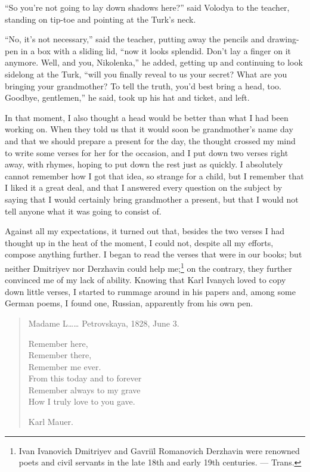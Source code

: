 ``So you're not going to lay down shadows here?'' said Volodya to the teacher, standing on tip-toe and pointing at the Turk's neck. %

``No, it's not necessary,'' said the teacher, putting away the pencils and drawing-pen in a box with a sliding lid, ``now it looks splendid. Don't lay a finger on it anymore. Well, and you, Nikolenka,'' he added, getting up and continuing to look sidelong at the Turk, ``will you finally reveal to us your secret? What are you bringing your grandmother? To tell the truth, you'd best bring a head, too. Goodbye, gentlemen,'' he said, took up his hat and ticket, and left.

In that moment, I also thought a head would be better than what I had been working on. When they told us that it would soon be grandmother's name day and that we should prepare a present for the day, the thought crossed my mind to write some verses for her for the occasion, and I put down two verses right away, with rhymes, hoping to put down the rest just as quickly. I absolutely cannot remember how I got that idea, so strange for a child, but I remember that I liked it a great deal, and that I answered every question on the subject by saying that I would certainly bring grandmother a present, but that I would not tell anyone what it was going to consist of.

Against all my expectations, it turned out that, besides the two verses I had thought up in the heat of the moment, I could not, despite all my efforts, compose anything further. I began to read the verses that were in our books; but neither Dmitriyev nor Derzhavin could help me;\footnote{Ivan Ivanovich Dmitriyev and Gavri\"il Romanovich Derzhavin were renowned poets and civil servants in the late 18th and early 19th centuries. --- Trans.} on the contrary, they further convinced me of my lack of ability. Knowing that Karl Ivanych loved to copy down little verses, I started to rummage around in his papers and, among some German poems, I found one, Russian, apparently from his own pen.

\begin{verse}
Madame L\ldots{}\ldots{} Petrovskaya, 1828, June 3.

Remember here,\\
Remember there,\\
Remember me ever.\\
From this today and to forever\\
Remember always to my grave\\
How I truly love to you gave.

Karl Mauer.
\end{verse}


